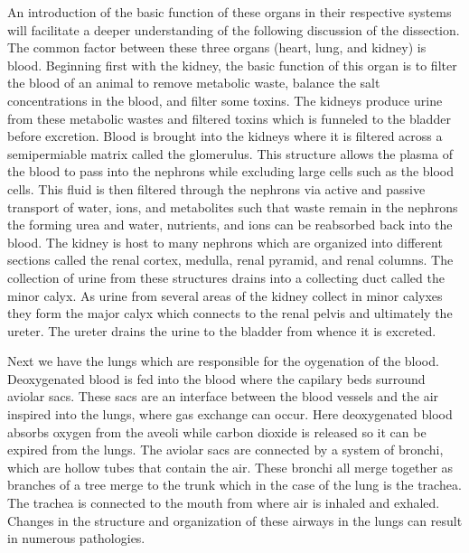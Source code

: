 \documentclass[12pt]{article}
\begin{document}
\par{}
An introduction of the basic function of these organs in their respective systems will facilitate a deeper understanding of the following discussion of the dissection. The common factor between these three organs (heart, lung, and kidney) is blood. Beginning first with the kidney, the basic function of this organ is to filter the blood of an animal to remove metabolic waste, balance the salt concentrations in the blood, and filter some toxins. The kidneys produce urine from these metabolic wastes and filtered toxins which is funneled to the bladder before excretion. Blood is brought into the kidneys where it is filtered across a semipermiable matrix called the glomerulus.\cite{Natsis2014a} This structure allows the plasma of the blood to pass into the nephrons while excluding large cells such as the blood cells. This fluid is then filtered through the nephrons via active and passive transport of water, ions, and metabolites such that waste remain in the nephrons the forming urea and water, nutrients, and ions can be reabsorbed back into the blood. The kidney is host to many nephrons which are organized into different sections called the renal cortex, medulla, renal pyramid, and renal columns. The collection of urine from these structures drains into a collecting duct called the minor calyx. As urine from several areas of the kidney collect in minor calyxes they form the major calyx which connects to the renal pelvis and ultimately the ureter. The ureter drains the urine to the bladder from whence it is excreted.\cite{Natsis2014a}
\par{}
Next we have the lungs which are responsible for the oygenation of the blood. Deoxygenated blood is fed into the blood where the capilary beds surround aviolar sacs. These sacs are an interface between the blood vessels and the air inspired into the lungs, where gas exchange can occur. Here deoxygenated blood absorbs oxygen from the aveoli while carbon dioxide is released so it can be expired from the lungs. The aviolar sacs are connected by a system of bronchi, which are hollow tubes that contain the air. These bronchi all merge together as branches of a tree merge to the trunk which in the case of the lung is the trachea. The trachea is connected to the mouth from where air is inhaled and exhaled.\cite{PMID:361341} Changes in the structure and organization of these airways in the lungs can result in numerous pathologies.\cite{Shaw2002}
\par{}
\end{document}
